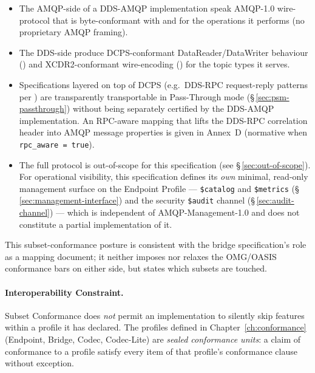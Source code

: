 \documentclass{../styles/zerodds-vendor-spec}
\begin{document}
\begin{itemize}
  \item The AMQP-side of a DDS-AMQP implementation 
        speak AMQP-1.0 wire-protocol that is byte-conformant with
         and
         for the operations it
        performs (no proprietary AMQP framing).
  \item The DDS-side  produce DCPS-conformant
        DataReader/DataWriter behaviour
        () and XCDR2-conformant
        wire-encoding () for the
        topic types it serves.
  \item Specifications layered on top of DCPS (e.g.\ DDS-RPC
        request-reply patterns per ) are
        transparently transportable in Pass-Through mode
        (\S\,\ref{sec:psm-passthrough}) without being separately
        certified by the DDS-AMQP implementation. An RPC-aware
        mapping that lifts the DDS-RPC correlation header into
        AMQP message properties is given in Annex~D (normative
        when \texttt{rpc\_aware = true}).
  \item The full  protocol is
        out-of-scope for this specification (see
        \S\,\ref{sec:out-of-scope}). For operational visibility,
        this specification defines its \emph{own} minimal,
        read-only management surface on the Endpoint Profile —
        \texttt{\$catalog} and \texttt{\$metrics}
        (\S\,\ref{sec:management-interface}) and the security
        \texttt{\$audit} channel (\S\,\ref{sec:audit-channel}) —
        which is independent of AMQP-Management-1.0 and does not
        constitute a partial implementation of it.
\end{itemize}

This subset-conformance posture is consistent with the bridge
specification's role as a mapping document; it neither imposes
nor relaxes the OMG/OASIS conformance bars on either side, but
states which subsets are touched.

\paragraph{Interoperability Constraint.}
Subset Conformance does \emph{not} permit an implementation to
silently skip features within a profile it has declared. The
profiles defined in Chapter~\ref{ch:conformance} (Endpoint,
Bridge, Codec, Codec-Lite) are \emph{sealed conformance units}:
a claim of conformance to a profile  satisfy every
item of that profile's conformance clause without exception.
\end{document}
